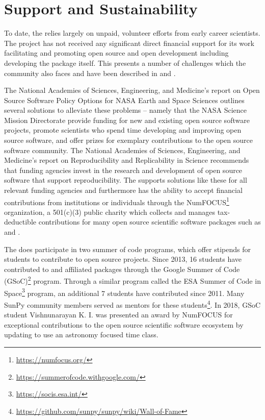 \section{Support and Sustainability}
\label{sec:support}

To date, the \sunpyproj relies largely on unpaid, volunteer efforts from early career scientists.
The project has not received any significant direct financial support for its work facilitating and promoting open source and open development including developing the \sunpypkg package itself.
This presents a number of challenges which the \astropy community also faces and have been described in \cite{PriceWhelan:2018ji} and \cite{Muna2016}.

The National Academies of Sciences, Engineering, and Medicine's report on Open Source Software Policy Options for NASA Earth and Space Sciences \citep{NAP2018} outlines several solutions to alleviate these problems -- namely that the NASA Science Mission Directorate provide funding for new and existing open source software projects, promote scientists who spend time developing and improving open source software, and offer prizes for exemplary contributions to the open source software community.
The National Academies of Sciences, Engineering, and Medicine's report on Reproducibility and Replicability in Science \citep{NAP2019} recommends that funding agencies invest in the research and development of open source software that support reproducibility.
The \sunpyproj supports solutions like these for all relevant funding agencies and furthermore has the ability to accept financial contributions from institutions or individuals through the NumFOCUS\footnote{\url{https://numfocus.org/}} organization, a 501(c)(3) public charity which collects and manages tax-deductible contributions for many open source scientific software packages such as \numpy and \astropy.

The \sunpyproj does participate in two summer of code programs, which offer stipends for students to contribute to open source projects.
Since 2013, 16 students have contributed to \sunpypkg and affiliated packages through the Google Summer of Code (GSoC)\footnote{\url{https://summerofcode.withgoogle.com/}} program.
Through a similar program called the ESA Summer of Code in Space\footnote{\url{https://socis.esa.int/}} program, an additional 7 students have contributed since 2011.
Many SunPy community members served as mentors for these students\footnote{\url{https://github.com/sunpy/sunpy/wiki/Wall-of-Fame}}.
In 2018, GSoC student Vishnunarayan K. I. was presented an award by NumFOCUS for exceptional contributions to the open source scientific software ecosystem by updating \sunpypkg to use an astronomy focused time class.
